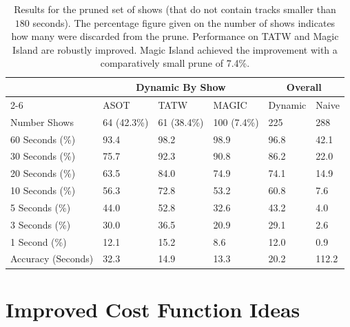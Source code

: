 \documentclass[twocolumn]{article}
\begin{document}
\begin{table}
\centering
\caption {Results for the pruned set of shows (that do not contain tracks smaller than $180$ seconds). The percentage figure given on the number of shows indicates how many were discarded from the prune. Performance on TATW and Magic Island are robustly improved. Magic Island achieved the improvement with a comparatively small prune of 7.4\%.} \label{tab:prunedresults} 
\vspace{1em}
{\setlength{\extrarowheight}{1.0pt}
\begin{tabular}{|l|l|l|l|l|l|}
\hline 
& \multicolumn{3}{c|}{\textbf{Dynamic By Show}}&  \multicolumn{2}{c|}{\textbf{Overall}}\\
\cline{2-6}
\multicolumn{1}{|>{\bf}l|}{}& {ASOT}& {TATW}& {MAGIC}& {Dynamic}& \multicolumn{1}{l|}{{Naive}}\\
\hline 
\multicolumn{1}{|l|}{Number Shows}& 64 (42.3\%) & 61 (38.4\%) & 100 (7.4\%) & 225& \multicolumn{1}{l|}{288}\\
\hline 
\multicolumn{1}{|l|}{ 60 Seconds (\%) }& 93.4& 98.2& 98.9& 96.8& \multicolumn{1}{l|}{42.1}\\
\hline 
\multicolumn{1}{|l|}{ 30 Seconds (\%) }& 75.7& 92.3& 90.8& 86.2& \multicolumn{1}{l|}{22.0}\\
\hline 
\multicolumn{1}{|l|}{ 20 Seconds (\%) }& 63.5& 84.0& 74.9& 74.1& \multicolumn{1}{l|}{14.9}\\
\hline 
\multicolumn{1}{|l|}{ 10 Seconds (\%) }& 56.3& 72.8& 53.2& 60.8& \multicolumn{1}{l|}{7.6}\\
\hline 
\multicolumn{1}{|l|}{ 5 Seconds (\%) }& 44.0& 52.8& 32.6& 43.2& \multicolumn{1}{l|}{4.0}\\
\hline 
\multicolumn{1}{|l|}{ 3 Seconds (\%) }& 30.0& 36.5& 20.9& 29.1& \multicolumn{1}{l|}{2.6}\\
\hline 
\multicolumn{1}{|l|}{ 1 Second (\%) }& 12.1& 15.2& 8.6& 12.0& \multicolumn{1}{l|}{0.9}\\
\hline 
\multicolumn{1}{|l|}{Accuracy (Seconds)}& 32.3& 14.9& 13.3& 20.2& \multicolumn{1}{l|}{112.2}\\
 \hline 
\end{tabular}}

\end{table}

\section{Improved Cost Function Ideas}\label{sec:improved-cost-function-ideas}
\end{document}
